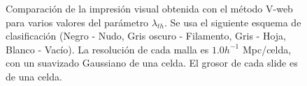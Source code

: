 \begin{figure}[htbp]
	\begin{center}
	\end{center}	
	
	\caption{\small{Comparación de la impresión visual obtenida con el  
	método V-web para varios valores del parámetro $\lambda_{th}$.
	Se usa el siguiente esquema de clasificación (Negro - Nudo, Gris 
	oscuro - Filamento, Gris - Hoja, Blanco - Vacío). La resolución de 
	cada malla es $1.0 h^{-1}$ Mpc/celda, con un suavizado Gaussiano de 
	una celda. El grosor de cada slide es de una celda.}}
	\label{fig:Vweb_Comparison}
\end{figure}


